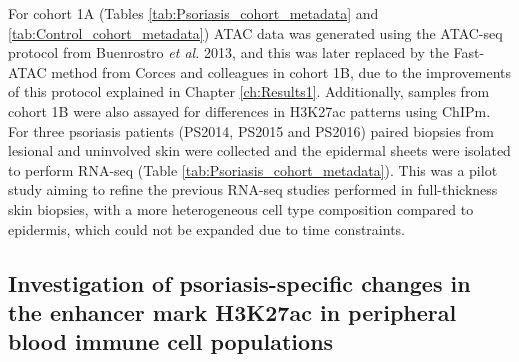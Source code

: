 For cohort 1A (Tables \ref{tab:Psoriasis_cohort_metadata} and \ref{tab:Control_cohort_metadata}) ATAC data was generated using the ATAC-seq protocol from Buenrostro \textit{et al.} 2013, and this was later replaced by the Fast-ATAC method from Corces and colleagues \parencite{Corces2016} in cohort 1B, due to the improvements of this protocol explained in Chapter \ref{ch:Results1}. Additionally, samples from cohort 1B were also assayed for differences in H3K27ac patterns using ChIPm. For three psoriasis patients (PS2014, PS2015 and PS2016) paired biopsies from lesional and uninvolved skin were collected and the epidermal sheets were isolated to perform RNA-seq (Table \ref{tab:Psoriasis_cohort_metadata}). This was a pilot study aiming to refine the previous RNA-seq studies performed in full-thickness skin biopsies, with a more heterogeneous cell type composition compared to epidermis, which could not be expanded due to time constraints.



%


\subsection{Investigation of psoriasis-specific changes in the enhancer mark H3K27ac in peripheral blood immune cell populations}

